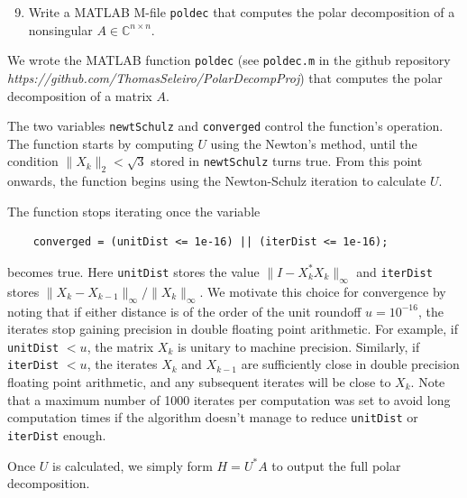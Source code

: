 \documentclass[10pt, A4paper]{article}
\newcommand{\nxn}{n \times n}
\begin{document}
\vspace{0.2cm}
\begin{enumerate}
	\setcounter{enumi}{8}
	\item Write a MATLAB M-file \texttt{poldec} that computes the 
	polar decomposition of a nonsingular $A \in \mathbb{C}^{\nxn}$.
\end{enumerate}

We wrote the MATLAB function \texttt{poldec} (see \texttt{poldec.m} in 
the github repository 
\emph{https://github.com/ThomasSeleiro/PolarDecompProj})
that computes the polar decomposition of a matrix $A$.

The two variables \texttt{newtSchulz} and \texttt{converged} control 
the function's operation.
The function starts by computing $U$ using the Newton's method, until
the condition $\|X_k\|_2 < \sqrt{3}$ stored in \texttt{newtSchulz} 
turns true. 
From this point onwards, the function begins 
using the {Newton-Schulz} iteration to calculate $U$.

The function stops iterating once the variable
\begin{verbatim}
	converged = (unitDist <= 1e-16) || (iterDist <= 1e-16);
\end{verbatim}
becomes true.
Here \texttt{unitDist} stores the value $\|I -X_k^*X_k\|_\infty$ and 
\texttt{iterDist} stores $\|X_k - X_{k-1} \|_\infty / \|X_k\|_\infty$.
We motivate this choice for convergence by noting that if either 
distance is of the order of the unit roundoff $u = 10^{-16}$, the 
iterates stop gaining precision in double floating point arithmetic.
For example, if \texttt{unitDist} $< u$, the matrix $X_k$ is unitary to 
machine precision. Similarly, if \texttt{iterDist} $< u$, the iterates 
$X_k$ and $X_{k-1}$ are sufficiently close in double precision floating 
point arithmetic, and any subsequent iterates will be close to $X_k$.
Note that a maximum number of 1000 iterates per computation was set to 
avoid long computation times if the algorithm doesn't manage to reduce 
\texttt{unitDist} or \texttt{iterDist} enough.

Once $U$ is calculated, we simply form $H = U^*A$ to output the full 
polar decomposition.
\end{document}
